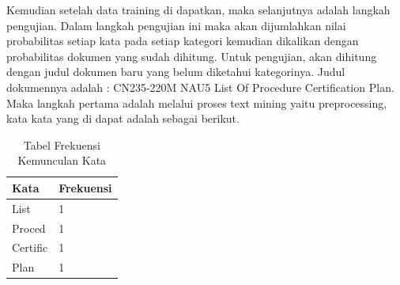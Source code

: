 \par Kemudian setelah data training di dapatkan, maka selanjutnya adalah langkah pengujian. Dalam langkah pengujian ini maka akan dijumlahkan nilai probabilitas setiap kata pada setiap kategori kemudian dikalikan dengan probabilitas dokumen yang sudah dihitung. Untuk pengujian, akan dihitung dengan judul dokumen baru yang belum diketahui kategorinya. Judul dokumennya adalah : CN235-220M NAU5 List Of Procedure Certification Plan. Maka langkah pertama adalah melalui proses text mining yaitu preprocessing, kata kata yang di dapat adalah sebagai berikut.
\begin{table}[]
\caption{Tabel Frekuensi Kemunculan Kata}
\begin{tabular}{|l|l|}
\hline
Kata     & Frekuensi \\ \hline
List     & 1         \\ \hline
Proced   & 1         \\ \hline
Certific & 1         \\ \hline
Plan     & 1         \\ \hline
\end{tabular}
\end{table}

